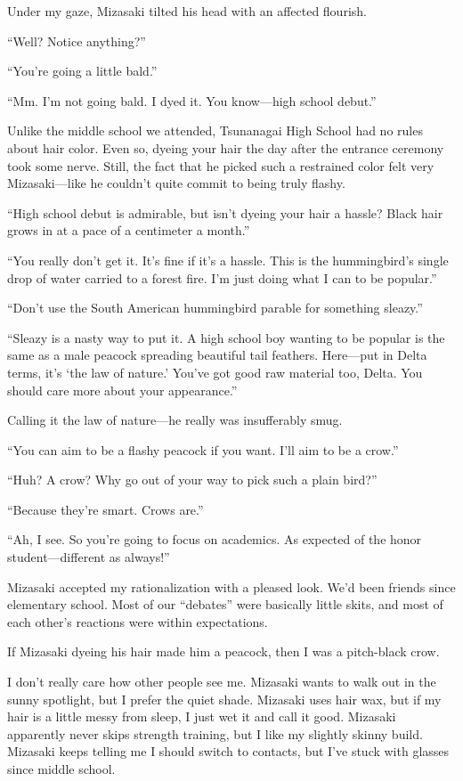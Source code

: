 \documentclass[
    a4paper,
    12pt,
    twoside,
    openany,
    UTF8,
    fontset=windows
]{ctexbook}
\begin{document}
Under my gaze, Mizasaki tilted his head with an affected flourish.

``Well? Notice anything?''

``You're going a little bald.''

``Mm. I'm not going bald. I dyed it. You know---high school debut.''

Unlike the middle school we attended, Tsunanagai High School had no rules about hair color. Even so, dyeing your hair the day after the entrance ceremony took some nerve. Still, the fact that he picked such a restrained color felt very Mizasaki---like he couldn't quite commit to being truly flashy.

``High school debut is admirable, but isn't dyeing your hair a hassle? Black hair grows in at a pace of a centimeter a month.''

``You really don't get it. It's fine if it's a hassle. This is the hummingbird's single drop of water carried to a forest fire. I'm just doing what I can to be popular.''

``Don't use the South American hummingbird parable for something sleazy.''

``Sleazy is a nasty way to put it. A high school boy wanting to be popular is the same as a male peacock spreading beautiful tail feathers. Here---put in Delta terms, it's `the law of nature.' You've got good raw material too, Delta. You should care more about your appearance.''

Calling it the law of nature---he really was insufferably smug.

``You can aim to be a flashy peacock if you want. I'll aim to be a crow.''

``Huh? A crow? Why go out of your way to pick such a plain bird?''

``Because they're smart. Crows are.''

``Ah, I see. So you're going to focus on academics. As expected of the honor student---different as always!''

Mizasaki accepted my rationalization with a pleased look. We'd been friends since elementary school. Most of our ``debates'' were basically little skits, and most of each other's reactions were within expectations.

If Mizasaki dyeing his hair made him a peacock, then I was a pitch-black crow.

I don't really care how other people see me. Mizasaki wants to walk out in the sunny spotlight, but I prefer the quiet shade. Mizasaki uses hair wax, but if my hair is a little messy from sleep, I just wet it and call it good. Mizasaki apparently never skips strength training, but I like my slightly skinny build. Mizasaki keeps telling me I should switch to contacts, but I've stuck with glasses since middle school.
\end{document}
